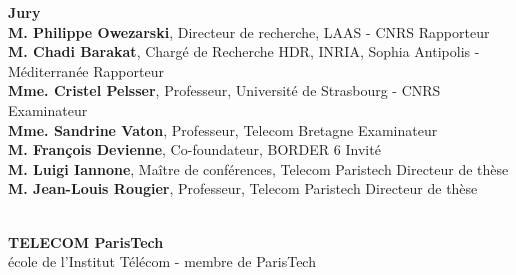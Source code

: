 \documentclass[11pt,a4paper]{book}
\begin{document}
\begin{minipage}{.91\textwidth}	%
{\bf Jury}\\
{\bf M. Philippe Owezarski}, {\small Directeur de recherche, LAAS - CNRS}
	\hfill Rapporteur\\
{\bf M. Chadi Barakat}, {\small Chargé de Recherche HDR, INRIA, Sophia Antipolis - Méditerranée}
	\hfill Rapporteur\\
{\bf Mme. Cristel Pelsser}, {\small Professeur, Université de Strasbourg - CNRS}
	\hfill Examinateur\\
{\bf Mme. Sandrine Vaton}, {\small Professeur, Telecom Bretagne}
	\hfill Examinateur\\
{\bf M. François Devienne}, {\small Co-foundateur, BORDER 6}
	\hfill Invit\'{e}\\
{\bf M. Luigi Iannone}, {\small Maître de conf\'{e}rences, Telecom Paristech}
	\hfill Directeur de th\`{e}se\\
{\bf M. Jean-Louis Rougier}, {\small Professeur, Telecom Paristech}
	\hfill Directeur de th\`{e}se\\

\end{minipage}\\
%
%
%
%
%
%
\centering
{\bf TELECOM ParisTech}\\
{\small école de l'Institut Télécom - membre de ParisTech}
%
%
%
\end{document}
